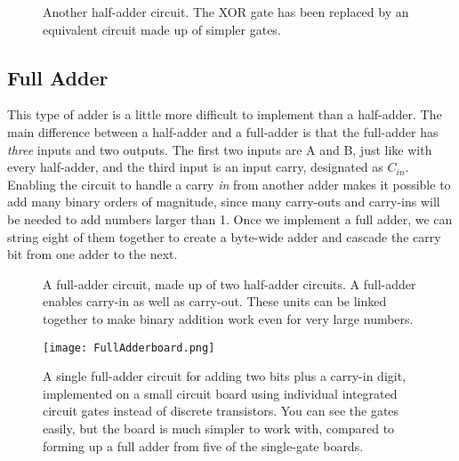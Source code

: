 \begin{figure}[!hb]
\begin{center}



\caption{Another half-adder circuit. The XOR gate has been replaced by an equivalent circuit made up of simpler gates.}
\end{center}
\end{figure}


\subsection*{Full Adder}

This type of adder is a little more difficult to implement than a half-adder. The main difference between a half-adder and a full-adder is that the full-adder has \emph{three} inputs and two outputs. The first two inputs are A and B, just like with every half-adder, and the third input is an input carry, designated as $C_{in}$. Enabling the circuit to handle a carry \emph{in} from another adder makes it possible to add many binary orders of magnitude, since many carry-outs and carry-ins will be needed to add numbers larger than 1. Once we implement a full adder, we can string eight of them together to create a byte-wide adder and cascade the carry bit from one adder to the next.
\bigskip

\begin{figure}[!hb]
\begin{center}

\caption{A full-adder circuit, made up of two half-adder circuits. A full-adder enables carry-in as well as carry-out. These units can be linked together to make binary addition work even for very large numbers.}
\end{center}
\end{figure}


\begin{figure}[!ht]
\begin{center}
\texttt{[image: FullAdderboard.png]}
\caption{A single full-adder circuit for adding two bits plus a carry-in digit, implemented on a small circuit board using individual integrated circuit gates instead of discrete transistors. You can see the gates easily, but the board is much simpler to work with, compared to forming up a full adder from five of the single-gate boards.}
\end{center}
\end{figure}




